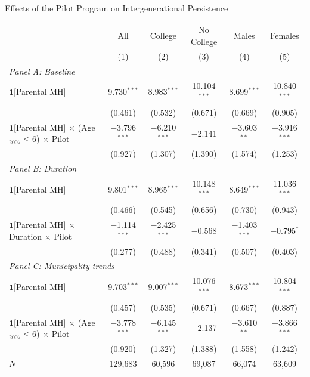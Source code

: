\documentclass[aspectratio=169]{beamer}
\begin{document}
\begin{frame}{Effects of the Pilot Program on Intergenerational Persistence}
  \scriptsize
  \begin{tabular}{lccccc}
    \toprule
    & All & College & No College & Males & Females \\
    & (1) & (2) & (3) & (4) & (5) \\
    \midrule
    \multicolumn{6}{l}{\textit{Panel A: Baseline}} \\[2pt]
    $\mathbf{1}$[Parental MH]
      & 9.730$^{***}$ & 8.983$^{***}$ & 10.104$^{***}$ & 8.699$^{***}$ & 10.840$^{***}$ \\
      & (0.461) & (0.532) & (0.671) & (0.669) & (0.905) \\
    $\mathbf{1}$[Parental MH] $\times$ (Age$_{2007}\leq 6$) $\times$ Pilot
      & $-$3.796$^{***}$ & $-$6.210$^{***}$ & $-$2.141 & $-$3.603$^{**}$ & $-$3.916$^{***}$ \\
      & (0.927) & (1.307) & (1.390) & (1.574) & (1.253) \\
    \midrule
    \multicolumn{6}{l}{\textit{Panel B: Duration}} \\[2pt]
    $\mathbf{1}$[Parental MH]
      & 9.801$^{***}$ & 8.965$^{***}$ & 10.148$^{***}$ & 8.649$^{***}$ & 11.036$^{***}$ \\
      & (0.466) & (0.545) & (0.656) & (0.730) & (0.943) \\
    $\mathbf{1}$[Parental MH] $\times$ Duration $\times$ Pilot
      & $-$1.114$^{***}$ & $-$2.425$^{***}$ & $-$0.568 & $-$1.403$^{***}$ & $-$0.795$^{*}$ \\
      & (0.277) & (0.488) & (0.341) & (0.507) & (0.403) \\
    \midrule
    \multicolumn{6}{l}{\textit{Panel C: Municipality trends}} \\[2pt]
    $\mathbf{1}$[Parental MH]
      & 9.703$^{***}$ & 9.007$^{***}$ & 10.076$^{***}$ & 8.673$^{***}$ & 10.804$^{***}$ \\
      & (0.457) & (0.535) & (0.671) & (0.667) & (0.887) \\
    $\mathbf{1}$[Parental MH] $\times$ (Age$_{2007}\leq 6$) $\times$ Pilot
      & $-$3.778$^{***}$ & $-$6.145$^{***}$ & $-$2.137 & $-$3.610$^{**}$ & $-$3.866$^{***}$ \\
      & (0.920) & (1.327) & (1.388) & (1.558) & (1.242) \\
    \midrule
    $N$ & 129,683 & 60,596 & 69,087 & 66,074 & 63,609 \\
    \bottomrule
    \end{tabular}
  \end{frame}
\end{document}
